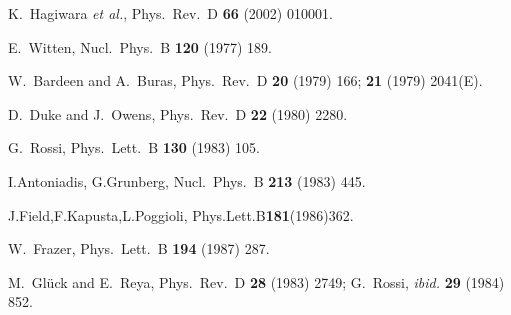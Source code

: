 \documentclass[aps,prl,twocolumn,groupedaddress]{revtex4}
\begin{document}
\begin{thebibliography}{1}


K.~Hagiwara {\it et al.},
Phys.\ Rev.\ D {\bf 66} (2002) 010001.


E.~Witten,
Nucl.\ Phys.\ B {\bf 120} (1977) 189.

W.~Bardeen and A.~Buras,
Phys.\ Rev.\ D {\bf 20} (1979) 166; {\bf 21} (1979) 2041(E).

D.~Duke and J.~Owens,
Phys.\ Rev.\ D {\bf 22} (1980) 2280.

G.~Rossi,
Phys.\ Lett.\ B {\bf 130} (1983) 105.

I.Antoniadis, G.Grunberg,
Nucl.\ Phys.\ B {\bf 213} (1983) 445.

J.Field,F.Kapusta,L.Poggioli,
Phys.Lett.B{\bf 181}(1986)362.

W.~Frazer,
Phys.\ Lett.\ B {\bf 194} (1987) 287.

M.~Gl\"uck and E.~Reya,
Phys.\ Rev.\ D {\bf 28} (1983) 2749;
G.~Rossi,
{\it ibid.}
{\bf 29} (1984) 852.


\end{thebibliography}
\end{document}
